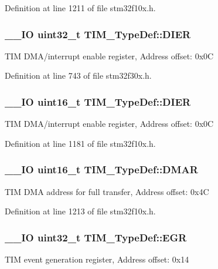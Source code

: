Definition at line 1211 of file stm32f10x.\-h.

\hypertarget{struct_t_i_m___type_def_a22a33c78ca5bec0e3e8559164a82b8ef}{
\subsubsection[{D\-I\-E\-R}]{\setlength{\rightskip}{0pt plus 5cm}\-\_\-\-\_\-\-I\-O {\bf uint32\-\_\-t} T\-I\-M\-\_\-\-Type\-Def\-::\-D\-I\-E\-R}}\label{struct_t_i_m___type_def_a22a33c78ca5bec0e3e8559164a82b8ef}
T\-I\-M D\-M\-A/interrupt enable register, Address offset\-: 0x0\-C 

Definition at line 743 of file stm32f30x.\-h.

\hypertarget{struct_t_i_m___type_def_a25b145e57a694bb384eee08fcd107c3a}{
\subsubsection[{D\-I\-E\-R}]{\setlength{\rightskip}{0pt plus 5cm}\-\_\-\-\_\-\-I\-O {\bf uint16\-\_\-t} T\-I\-M\-\_\-\-Type\-Def\-::\-D\-I\-E\-R}}\label{struct_t_i_m___type_def_a25b145e57a694bb384eee08fcd107c3a}
T\-I\-M D\-M\-A/interrupt enable register, Address offset\-: 0x0\-C 

Definition at line 1181 of file stm32f10x.\-h.

\hypertarget{struct_t_i_m___type_def_a4e0fbb52e6dd4bdabcb3f3b2f4bae40c}{
\subsubsection[{D\-M\-A\-R}]{\setlength{\rightskip}{0pt plus 5cm}\-\_\-\-\_\-\-I\-O {\bf uint16\-\_\-t} T\-I\-M\-\_\-\-Type\-Def\-::\-D\-M\-A\-R}}\label{struct_t_i_m___type_def_a4e0fbb52e6dd4bdabcb3f3b2f4bae40c}
T\-I\-M D\-M\-A address for full transfer, Address offset\-: 0x4\-C 

Definition at line 1213 of file stm32f10x.\-h.

\hypertarget{struct_t_i_m___type_def_a04248d87f48303fd2267810104a7878d}{
\subsubsection[{E\-G\-R}]{\setlength{\rightskip}{0pt plus 5cm}\-\_\-\-\_\-\-I\-O {\bf uint32\-\_\-t} T\-I\-M\-\_\-\-Type\-Def\-::\-E\-G\-R}}\label{struct_t_i_m___type_def_a04248d87f48303fd2267810104a7878d}
T\-I\-M event generation register, Address offset\-: 0x14 

